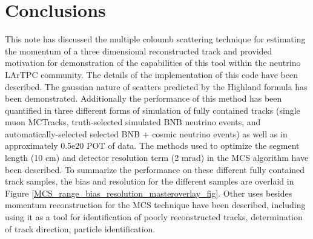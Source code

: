 \section{Conclusions}

This note has discussed the multiple coloumb scattering technique for estimating the momentum of a three dimensional reconstructed track and provided motivation for demonstration of the capabilities of this tool within the neutrino LArTPC community. The details of the implementation of this code have been described. The gaussian nature of scatters predicted by the Highland formula has been demonstrated. Additionally the performance of this method has been quantified in three different forms of simulation of fully contained tracks (single muon {\sc MCTracks}, truth-selected simulated BNB neutrino events, and automatically-selected selected BNB + cosmic neutrino events) as well as in approximately 0.5e20 POT of {\ub} data. The methods used to optimize the segment length (10 cm) and detector resolution term (2 mrad) in the MCS algorithm have been described. To summarize the performance on these different fully contained track samples, the bias and resolution for the different samples are overlaid in Figure \ref{MCS_range_bias_resolution_masteroverlay_fig}. Other uses besides momentum reconstruction for the MCS technique have been described, including using it as a tool for identification of poorly reconstructed tracks, determination of track direction, particle identification. 


